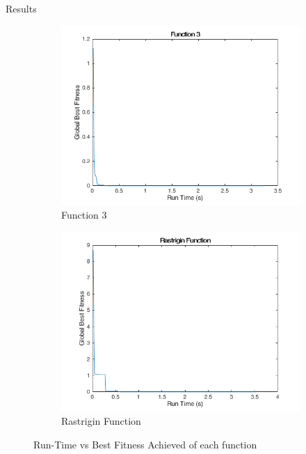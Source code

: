 \documentclass{beamer}
\begin{document}
\begin{frame}{Results}
\begin{figure}
  \begin{subfigure}[b]{0.4\textwidth}
    \includegraphics[width=\textwidth]{img/summary/function3}
    \caption{Function 3}
  \end{subfigure}
  \begin{subfigure}[b]{0.4\textwidth}
    \includegraphics[width=\textwidth]{img/summary/rastrigin}
    \caption{Rastrigin Function}
  \end{subfigure}
  \caption{Run-Time vs Best Fitness Achieved of each function}
\end{figure}
\end{frame}
\end{document}
